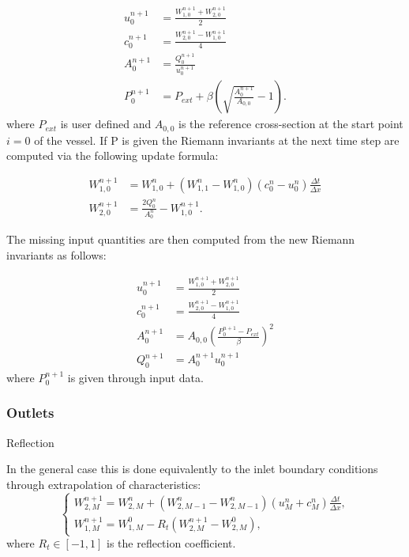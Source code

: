 \documentclass[a4paper, oneside]{discothesis}
\begin{document}
\begin{align}
	u_0^{n+1} &= \frac{W_{1,0}^{n+1} + W_{2,0}^{n+1}}{2} \\
	c_0^{n+1} &= \frac{W_{2,0}^{n+1} - W_{1,0}^{n+1}}{4} \\
	A_0^{n+1} &= \frac{Q_0^{n+1}}{u_0^{n+1}} \\
	P_0^{n+1} &= P_{ext} + \beta \left( \sqrt{\frac{A_0^{n+1}}{A_{0,0}}} - 1 \right). 
\end{align}
where $P_{ext}$ is user defined and $A_{0,0}$ is the reference cross-section at the start point $i=0$ of the vessel.
If P is given the Riemann invariants at the next time step are computed via the following update formula:

\begin{align}
	W_{1,0}^{n+1} &= W^n_{1,0} + (W^n_{1,1} - W^n_{1,0})(c^n_0-u^n_0) \frac{\Delta t}{\Delta x} \label{update1b}\\
	W_{2,0}^{n+1} &= \frac{2Q^{n}_0}{A^n_0} - W^{n+1}_{1,0} \label{update2b}.
\end{align}

The missing input quantities are then computed from the new Riemann invariants as follows:

\begin{align}
	u_0^{n+1} &= \frac{W_{1,0}^{n+1} + W_{2,0}^{n+1}}{2} \\
	c_0^{n+1} &= \frac{W_{2,0}^{n+1} - W_{1,0}^{n+1}}{4} \\
	A_0^{n+1} &= A_{0,0}\left(\frac{P_0^{n+1}-P_{ext}}{\beta}\right)^2\\
	Q_0^{n+1} &= A_0^{n+1} u_0^{n+1}
\end{align}
where $P^{n+1}_0$ is given through input data.
\subsubsection{Outlets}

Reflection

In the general case this is done equivalently to the inlet boundary conditions through extrapolation of characteristics:
\begin{equation}
	\left\{\begin{array}{l}
			W_{2,M}^{n+1}=W_{2,M}^n+(W_{2,M-1}^n-W_{2,M-1}^n) (u_M^n+c_M^n) \frac{\Delta t}{\Delta x}, \\
			W_{1,M}^{n+1}=W_{1,M}^0-R_t (W_{2,M}^{n+1}-W_{2,M}^0),
	\end{array}\right.
\end{equation}
where $R_t \in [-1,1]$ is the reflection coefficient.
\end{document}

